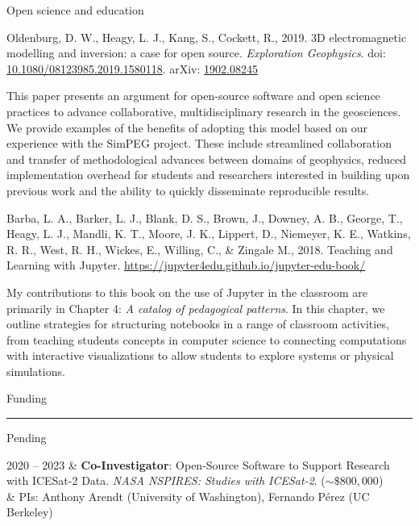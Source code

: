 \documentclass[a4paper, 11pt]{article}
\newcommand{\arxiv}[1]{arXiv: \href{https://arxiv.org/abs/#1}{#1}}
\newcommand{\doi}[1]{doi: \href{https://doi.org/#1}{#1}}
\newcommand{\heading}[1]{
    \begin{minipage}[t]{\textwidth}
    \vspace{0.05cm}
    {\LARGE #1}\\
    \vspace{-0.24cm}
    \hrule
    \end{minipage}
    \vspace{0.05cm}

}
\newcommand{\subheading}[1]{
    \vspace{0.4cm}
    {\Large #1}\\
    \vspace{-0.2cm}
}
\begin{document}
\subheading{Open science and education}

\begin{myitemize}
\item Oldenburg, D. W., Heagy, L. J., Kang, S., Cockett, R., 2019. 3D electromagnetic modelling and inversion: a case for open source. \emph{Exploration Geophysics}. \doi{10.1080/08123985.2019.1580118}. \arxiv{1902.08245}
\end{myitemize}

This paper presents an argument for open-source software and open science practices to advance collaborative, multidisciplinary research in the geosciences. We provide examples of the benefits of adopting this model based on our experience with the SimPEG project. These include streamlined collaboration and transfer of methodological advances between domains of geophysics, reduced implementation overhead for students and researchers interested in building upon previous work and the ability to quickly disseminate reproducible results.
\\

\begin{myitemize}
\item Barba, L. A., Barker, L. J., Blank, D. S., Brown, J., Downey, A. B., George, T., Heagy, L. J.,  Mandli, K. T., Moore, J. K., Lippert, D.,  Niemeyer, K. E., Watkins, R. R., West, R. H., Wickes, E., Willing, C., \& Zingale M., 2018. Teaching and Learning with Jupyter. \linebreak \href{https://jupyter4edu.github.io/jupyter-edu-book/}{https://jupyter4edu.github.io/jupyter-edu-book/}
\end{myitemize}

My contributions to this book on the use of Jupyter in the classroom are primarily in Chapter 4: \emph{A catalog of pedagogical patterns}. In this chapter, we outline strategies for structuring notebooks in a range of classroom activities, from teaching students concepts in computer science to connecting computations with interactive visualizations to allow students to explore systems or physical simulations.


\heading{Funding}

\subheading{Pending}
\begin{entryright}
2020 -- 2023 & \textbf{Co-Investigator}: Open-Source Software to Support Research with ICESat-2 Data. \emph{NASA NSPIRES: Studies with ICESat-2}. ($\sim \$800,000 $)\\
& PIs: Anthony Arendt (University of Washington), Fernando P\'erez (UC Berkeley) \\
\end{entryright}
\end{document}
